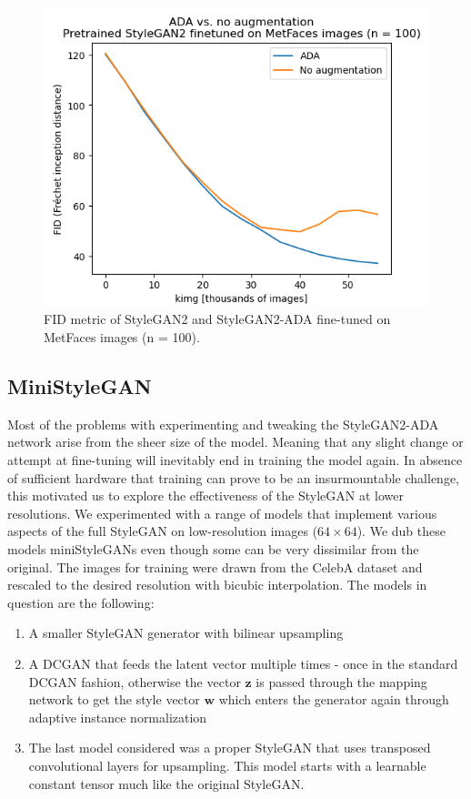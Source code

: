 \documentclass[conference]{IEEEtran}
\begin{document}
\begin{figure}[!h]
	\begin{center}
		\includegraphics[width=1\columnwidth]{./images/fid_ada_vs_noada.png}
		\caption{FID metric of StyleGAN2 and StyleGAN2-ADA fine-tuned on MetFaces images (n = 100).}
		\label{fig:figure8}
	\end{center}
\end{figure}

\subsection{MiniStyleGAN}
Most of the problems with experimenting and tweaking the StyleGAN2-ADA network arise from the sheer size of the model. Meaning that any slight change or attempt at fine-tuning will inevitably end in training the model again. In absence of sufficient hardware that training can prove to be an insurmountable challenge, this motivated us to explore the effectiveness of the StyleGAN at lower resolutions. We experimented with a range of models that implement various aspects of the full StyleGAN on low-resolution images ($64 \times 64$). We dub these models miniStyleGANs even though some can be very dissimilar from the original.
The images for training were drawn from the CelebA dataset and rescaled to the desired resolution with bicubic interpolation.
The models in question are the following:
\begin{enumerate}
	\item A smaller StyleGAN generator \cite{STYLEGAN} with bilinear upsampling
	\item A DCGAN that feeds the latent vector multiple times - once in the standard DCGAN fashion, otherwise the vector $\mathbf{z}$ is passed through the mapping network to get the style vector $\mathbf{w}$ which enters the generator again through adaptive instance normalization
	\item The last model considered was a proper StyleGAN that uses transposed convolutional layers for upsampling. This model starts with a learnable constant tensor much like the original StyleGAN.
\end{enumerate}
\end{document}
